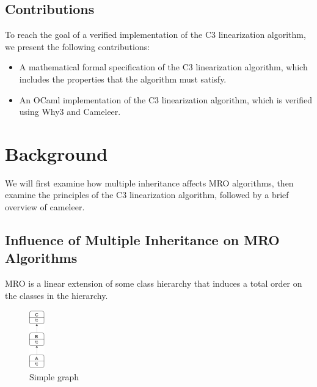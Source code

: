 \documentclass[runningheads]{llncs}
\begin{document}
\subsection{Contributions}
To reach the goal of a verified implementation of the C3 linearization algorithm, we present the following contributions:
\begin{itemize}
    \item A mathematical formal specification of the C3 linearization algorithm, which includes the properties that the algorithm must satisfy.
    \item An OCaml implementation of the C3 linearization algorithm, which is verified using Why3 and Cameleer.
\end{itemize}

\section{Background}

We will first examine how multiple inheritance affects MRO algorithms, then examine the principles of the C3 linearization algorithm, followed by a brief overview of cameleer.

\subsection{Influence of Multiple Inheritance on MRO Algorithms}
MRO is a linear extension of some class hierarchy
 that induces a total order on the classes in the hierarchy\autocite{hivertControllingC3Super2024}.

\begin{figure}[htbp]
  \centering
  \includegraphics[width=0.06\textwidth]{images/SimpleDiagram.png}
  \caption{Simple graph}
  \label{fig:simpleDiagram}
\end{figure}
\end{document}
